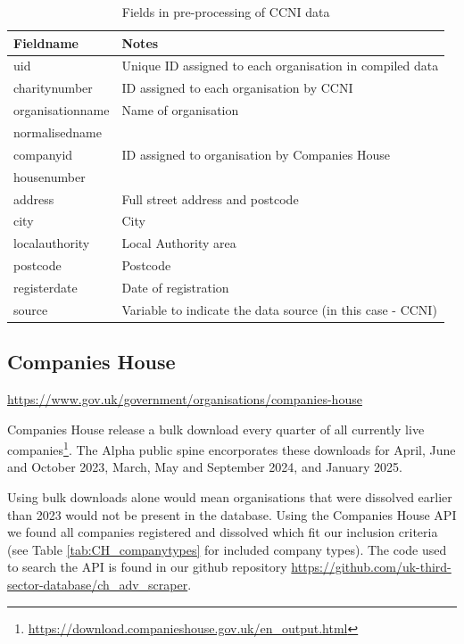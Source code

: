 \documentclass{article}
\begin{document}
\begin{table}[h]
  \centering
  \begin{tabularx}{\textwidth}{|l|X|}
    \hline
    Fieldname  &	Notes \\
    \hline \hline
uid & Unique ID assigned to each organisation in compiled data \\ \hline
charitynumber & ID assigned to each organisation by CCNI \\ \hline
organisationname & Name of organisation \\ \hline
normalisedname & \\ \hline
companyid & ID assigned to organisation by Companies House \\ \hline
housenumber & \\ \hline
address & Full street address and postcode \\ \hline
city & City \\ \hline
localauthority & Local Authority area \\ \hline
postcode & Postcode \\ \hline
registerdate & Date of registration \\ \hline
source & Variable to indicate the data source (in this case - CCNI) \\ \hline
\end{tabularx}
\caption{Fields in pre-processing of CCNI data}
\label{tab:ccni_preprocess}
\end{table}


\clearpage
\subsection{Companies House}
\url{https://www.gov.uk/government/organisations/companies-house}



Companies House release a bulk download every quarter of all currently live companies\footnote{\url{https://download.companieshouse.gov.uk/en_output.html}}. The Alpha public 
spine encorporates these downloads for April, June and October 2023, March, May and September 2024, and January 2025. 


Using bulk downloads alone would mean organisations that were dissolved earlier than 2023 would 
not be present in the database. Using the Companies House API
we found all companies registered and dissolved which fit our inclusion criteria (see Table \ref{tab:CH_companytypes} for included
company types). 
The code used to search the API is found in our 
github repository 
\url{https://github.com/uk-third-sector-database/ch_adv_scraper}. 
\end{document}
